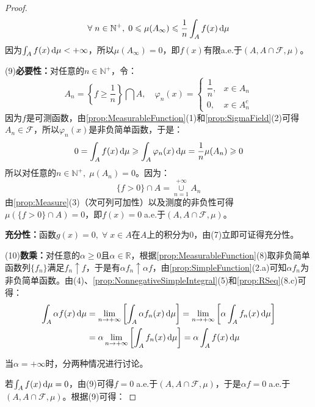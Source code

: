 \begin{proof}
	\begin{equation*}
		\forall\;n\in\mathbb{N}^+,\;0\leqslant \mu(A_\infty)\leqslant\frac{1}{n}\int_{A}f(x)\mathop{}\!\mathrm{d}\mu
	\end{equation*}
	因为$\int_{A}f(x)\mathop{}\!\mathrm{d}\mu<+\infty$，所以$\mu(A_\infty)=0$，即$f(x)$有限a.e.于$(A,A\cap\mathscr{F},\mu)$。\par
	(9)\textbf{必要性：}对任意的$n\in\mathbb{N}^+$，令：
	\begin{equation*}
		A_n=\left\{f\geqslant\frac{1}{n}\right\}\bigcap A,\quad
		\varphi_n(x)=
		\begin{cases}
			\dfrac{1}{n},&x\in A_n \\
			0,&x\in A_n^c
		\end{cases}
	\end{equation*}
	因为$f$是可测函数，由\cref{prop:MeasurableFunction}(1)和\cref{prop:SigmaField}(2)可得$A_n\in\mathscr{F}$，所以$\varphi_n(x)$是非负简单函数，于是：
	\begin{equation*}
		0=\int_{A}f(x)\mathop{}\!\mathrm{d}\mu\geqslant\int_{A}\varphi_n(x)\mathop{}\!\mathrm{d}\mu=\frac{1}{n}\mu(A_n)\geqslant0
	\end{equation*}
	所以对任意的$n\in\mathbb{N}^+,\;\mu(A_n)=0$。因为：
	\begin{equation*}
		\{f>0\}\cap A=\underset{n=1}{\overset{+\infty}{\cup}}A_n
	\end{equation*}
	由\cref{prop:Measure}(3)（次可列可加性）以及测度的非负性可得$\mu(\{f>0\}\cap A)=0$，即$f(x)=0\;$a.e.于$(A,A\cap\mathscr{F},\mu)$。\par
	\textbf{充分性：}函数$g(x)=0,\;\forall\;x\in A$在$A$上的积分为$0$，由(7)立即可证得充分性。\par
	(10)\textbf{数乘：}对任意的$\alpha\geqslant0$且$\alpha\in\mathbb{R}$，根据\cref{prop:MeasurableFunction}(8)取非负简单函数列$\{f_n\}$满足$f_n\uparrow f$，于是有$\alpha f_n\uparrow \alpha f$，由\cref{prop:SimpleFunction}(2.a)可知$\alpha f_n$为非负简单函数。由(4)、\cref{prop:NonnegativeSimpleIntegral}(5)和\cref{prop:RSeq}(8.c)可得：
	\begin{align*}
		\int_{A}\alpha f(x)\mathop{}\!\mathrm{d}\mu&=\lim_{n\to+\infty}\left[\int_{A}\alpha f_n(x)\mathop{}\!\mathrm{d}\mu\right]=\lim_{n\to+\infty}\left[\alpha\int_{A}f_n(x)\mathop{}\!\mathrm{d}\mu\right] \\
		&=\alpha\lim_{n\to+\infty}\left[\int_{A}f_n(x)\mathop{}\!\mathrm{d}\mu\right]=\alpha\int_{A}f(x)\mathop{}\!\mathrm{d}\mu
	\end{align*}\par
	当$\alpha=+\infty$时，分两种情况进行讨论。\par
	若$\int_{A}f(x)\mathop{}\!\mathrm{d}\mu=0$，由(9)可得$f=0\;$a.e.于$(A,A\cap\mathscr{F},\mu)$，于是$\alpha f=0\;$a.e.于$(A,A\cap\mathscr{F},\mu)$。根据(9)可得：

\end{proof}
